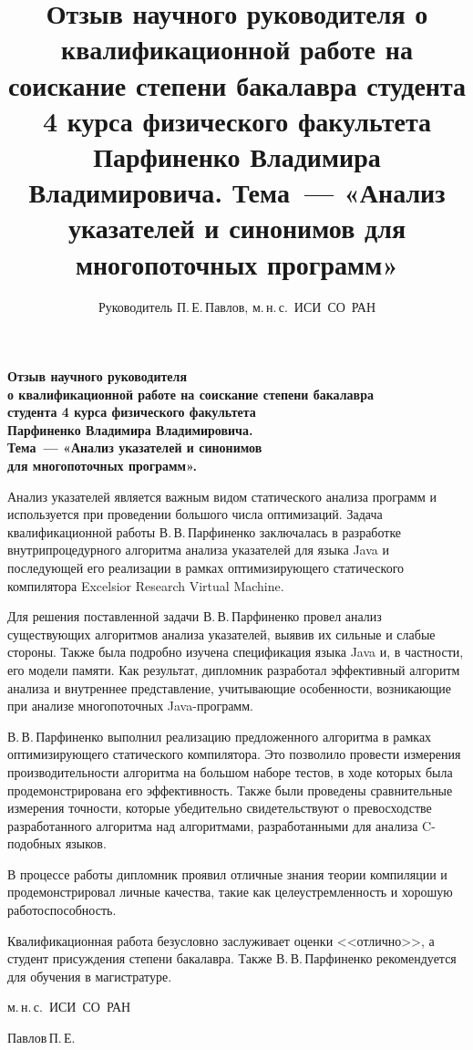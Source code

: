 \documentclass[12pt]{article}
\title{
  Отзыв научного руководителя о квалификационной работе на соискание степени
  бакалавра студента 4 курса физического факультета Парфиненко Владимира
  Владимировича.
  Тема~--- «Анализ указателей и синонимов для многопоточных программ»
}
\author{
  Руководитель П.\,Е.\,Павлов, м.\,н.\,с.~ИСИ~СО~РАН
}
\newcommand{\eng}[1]{{\English#1}}
\def\parf{В.\,В.\,Парфиненко\xspace}
\begin{document}
  \thispagestyle{empty}

  \begin{center}
    \bfseries
    Отзыв научного руководителя\\
    о квалификационной работе на соискание степени бакалавра\\
    студента 4 курса физического факультета\\
    Парфиненко Владимира Владимировича.\\
    Тема~--- «Анализ указателей и синонимов\\
    для многопоточных программ».
  \end{center}
  \vspace{0.5cm}

  Анализ указателей является важным видом статического анализа программ и
  используется при проведении большого числа оптимизаций. Задача
  квалификационной работы \parf заключалась в разработке внутрипроцедурного
  алгоритма анализа указателей для языка \eng{Java} и последующей его
  реализации в рамках оптимизирующего статического компилятора \eng{Excelsior
  Research Virtual Machine}.

  Для решения поставленной задачи \parf провел анализ существующих алгоритмов
  анализа указателей, выявив их сильные и слабые стороны. Также была подробно
  изучена спецификация языка \eng{Java} и, в частности, его модели памяти. Как
  результат, дипломник разработал эффективный алгоритм анализа и
  внутреннее представление, учитывающие особенности, возникающие при анализе
  многопоточных \eng{Java}-программ.

  \parf выполнил реализацию предложенного алгоритма в рамках оптимизирующего
  статического компилятора. Это позволило провести измерения производительности
  алгоритма на большом наборе тестов, в ходе которых была продемонстрирована
  его эффективность.
  Также были проведены сравнительные измерения точности, которые убедительно
  свидетельствуют о превосходстве разработанного алгоритма над алгоритмами,
  разработанными для анализа \eng{C}-подобных языков.

  В процессе работы дипломник проявил отличные знания теории компиляции и
  продемонстрировал личные качества, такие как целеустремленность и хорошую
  работоспособность.

  Квалификационная работа безусловно заслуживает оценки <<отлично>>, а студент
  присуждения степени бакалавра. Также \parf рекомендуется для обучения в
  магистратуре.

  \vspace{0.2cm}

  \begin{flushright}

    м.\,н.\,с.~ИСИ~СО~РАН

    Павлов\,П.\,Е.

  \end{flushright}
\end{document}
